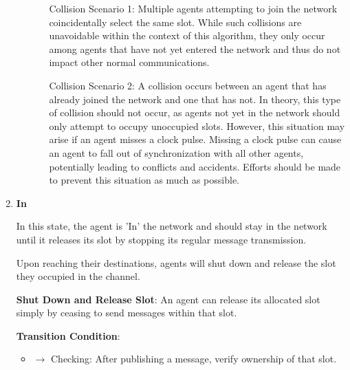 \begin{enumerate}
\begin{itemize}
\begin{itemize}
            \subitem Collision Scenario 1: Multiple agents attempting to join the network coincidentally select the same slot. While such collisions are unavoidable within the context of this algorithm, they only occur among agents that have not yet entered the network and thus do not impact other normal communications.
            
            \subitem Collision Scenario 2: A collision occurs between an agent that has already joined the network and one that has not. In theory, this type of collision should not occur, as agents not yet in the network should only attempt to occupy unoccupied slots. However, this situation may arise if an agent misses a clock pulse. Missing a clock pulse can cause an agent to fall out of synchronization with all other agents, potentially leading to conflicts and accidents. Efforts should be made to prevent this situation as much as possible.
        \end{itemize}

    \end{itemize}    


    \item \textbf{In}
    
    In this state, the agent is 'In' the network and should stay in the network until it releases its slot by stopping its regular message transmission.
    
    Upon reaching their destinations, agents will shut down and release the slot they occupied in the channel.
    
    \textbf{Shut Down and Release Slot}:
    An agent can release its allocated slot simply by ceasing to send messages within that slot.
    
    \textbf{Transition Condition}:
    \begin{itemize}
        \item $\rightarrow$ Checking: After publishing a message, verify ownership of that slot.
    \end{itemize}

\end{enumerate}


